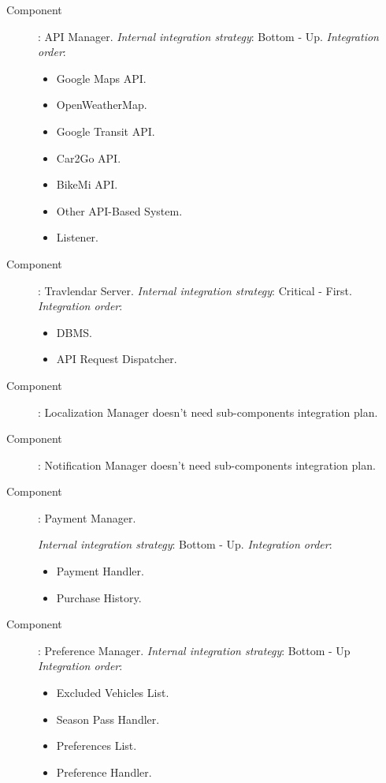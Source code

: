 	\begin{description}
	
	\item[Component]: API Manager.
		\textit{Internal integration strategy}: Bottom - Up.
		\textit{Integration order}:
		\begin{itemize}
			\item Google Maps API.
			\item OpenWeatherMap.
			\item Google Transit API.
			\item Car2Go API.
			\item BikeMi API.
			\item Other API-Based System.
			\item Listener.
		\end{itemize}


	\item[Component]: Travlendar Server.
		\textit{Internal integration strategy}: Critical - First.
		\textit{Integration order}:
		\begin{itemize}
			\item DBMS.
			\item API Request Dispatcher.
		\end{itemize}
	
	\item[Component]: Localization Manager doesn't need sub-components integration plan.

	\item[Component]: Notification Manager doesn't need sub-components integration plan.
	
	\item[Component]: Payment Manager.

		\textit{Internal integration strategy}: Bottom - Up.
		\textit{Integration order}:
		\begin{itemize}
			\item Payment Handler.
			\item Purchase History.
		\end{itemize}
	
	\item[Component]: Preference Manager.
		\textit{Internal integration strategy}: Bottom - Up
		\textit{Integration order}:
		\begin{itemize}
			\item Excluded Vehicles List.
			\item Season Pass Handler.
			\item Preferences List.
			\item Preference Handler.
		\end{itemize}
	

\end{description}
